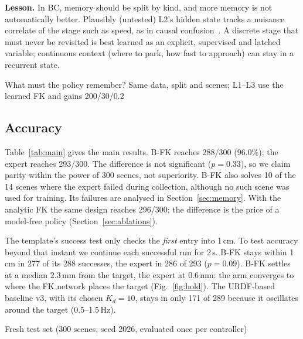 \documentclass[conference]{IEEEtran}
\begin{document}
\textbf{Lesson.} In BC, memory should be split by kind, and more memory is not automatically better.
Plausibly (untested) L2's hidden state tracks a nuisance correlate of the stage such as speed, as in
causal confusion~\cite{dehaan2019causal}. A discrete stage that must never be revisited
is best learned as an explicit, supervised and latched variable; continuous context (where to park,
how fast to approach) can stay in a recurrent state.

\begin{table}[t]
\centering\footnotesize
\caption{What must the policy remember? Same data, split and scenes; L1--L3 use the learned FK and gains 200/30/0.2}
\label{tab:memory}
\begin{adjustbox}{max width=\columnwidth}\end{adjustbox}
\end{table}

\subsection{Accuracy}
Table~\ref{tab:main} gives the main results. B-FK reaches 288/300 (96.0\%); the expert reaches 293/300.
The difference is not significant ($p=0.33$), so we claim parity within the power of 300 scenes, not
superiority. B-FK also solves 10 of the 14 scenes where the expert failed during collection, although no
such scene was used for training. Its failures are analysed in Section~\ref{sec:memory}. With the
analytic FK the same design reaches 296/300; the difference is the price of a model-free policy
(Section~\ref{sec:ablations}).

The template's success test only checks the \emph{first} entry into 1\,cm. To test accuracy beyond that
instant we continue each successful run for 2\,s. B-FK stays within 1\,cm in 277 of its 288 successes,
the expert in 286 of 293 ($p=0.09$). B-FK settles at a median 2.3\,mm from the target, the expert at
0.6\,mm: the arm converges to where the FK network places the target (Fig.~\ref{fig:hold}). The
URDF-based baseline v3, with its chosen $K_d=10$, stays in only 171 of 289 because it oscillates around
the target (0.5--1.5\,Hz).

\begin{table}[t]
\centering\footnotesize
\caption{Fresh test set (300 scenes, seed 2026, evaluated once per controller)}
\label{tab:main}
\begin{adjustbox}{max width=\columnwidth}\end{adjustbox}
\end{table}
\end{document}
